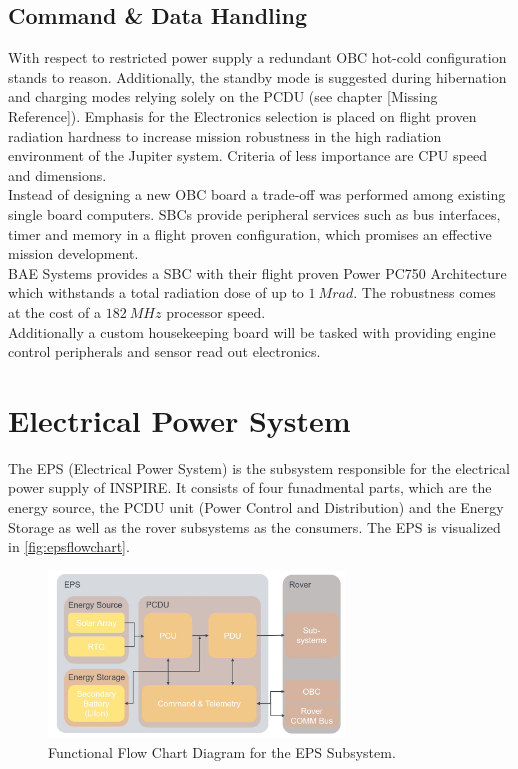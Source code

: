  \subsection{Command \& Data Handling}
 
 With respect to restricted power supply a redundant OBC hot-cold configuration stands to reason. Additionally, the standby mode is suggested during hibernation and charging modes relying solely on the PCDU (see chapter [Missing Reference]). 
Emphasis for the Electronics selection is placed on flight proven radiation hardness to increase mission robustness in the high radiation environment of the Jupiter system. 
Criteria of less importance are CPU speed and dimensions. \\

Instead of designing a new OBC board a trade-off was performed among existing single board computers. SBCs provide peripheral services such as bus interfaces, timer and memory in a flight proven configuration, which promises an effective mission development. \\

BAE Systems provides a SBC with their flight proven Power PC750 Architecture which withstands a total radiation dose of up to $1\ Mrad$. The robustness comes at the cost of a $182\ MHz$ processor speed. \\

Additionally a custom housekeeping board will be tasked with providing engine control peripherals and sensor read out electronics. 
 
\clearpage


\section{Electrical Power System}
\label{sec:EPS}
The EPS (Electrical Power System) is the subsystem responsible for the electrical power supply of INSPIRE. It consists of four funadmental parts, which are the energy source, the PCDU unit (Power Control and Distribution) and the Energy Storage as well as the rover subsystems as the consumers. The EPS is visualized in \autoref{fig:epsflowchart}.

\begin{figure}[htb]
{\centering
\includegraphics[width=0.7\textwidth]{Media/epsflowchart}
\caption{Functional Flow Chart Diagram for the EPS Subsystem.}
\label{fig:epsflowchart}
}
\end{figure}


